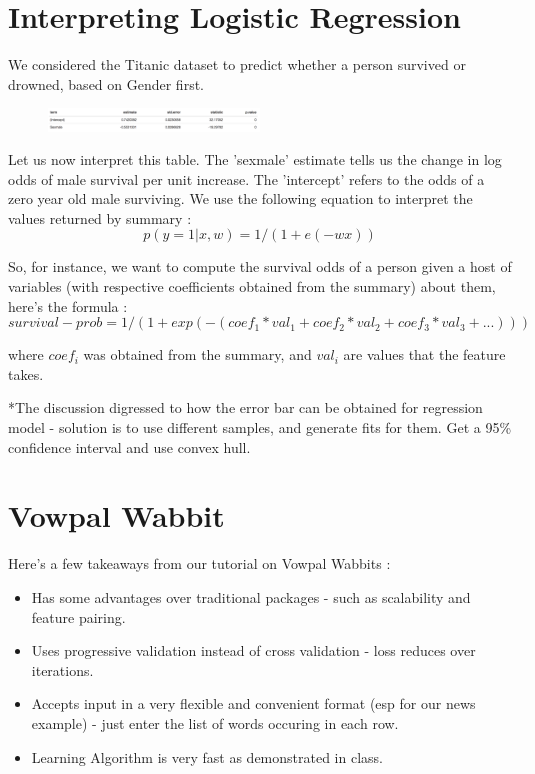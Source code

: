 \section{Interpreting Logistic Regression}

We considered the Titanic dataset to predict whether a person survived or drowned, based on Gender first. 
\begin{figure}[ht]
  \begin{center}
    \includegraphics[width=0.5\textwidth]{figures/fig-3.png}
    \caption{}
    \label{fig:example_figure3}
  \end{center}
\end{figure}

Let us now interpret this table. The 'sexmale' estimate tells us the change in log odds of male survival per unit increase. The 'intercept' refers to the odds of a zero year old male surviving. We use the following equation to interpret the values returned by summary :
\begin{equation}
  p(y=1|x,w) = 1/(1+e(-wx))
\end{equation}

So, for instance, we want to compute the survival odds of a person given a host of variables (with respective coefficients obtained from the summary) about them, here's the formula :
\begin{equation}
  survival-prob = 1/(1+exp(-(coef_{1}*val_{1} +coef_{2}*val_{2} + coef_{3}*val_{3} + ...)))
\end{equation}

where $ coef_{i}$ was obtained from the summary, and $val_{i}$ are values that the feature takes.

*The discussion digressed to how the error bar can be obtained for regression model - solution is to use different samples, and generate fits for them. Get a 95\% confidence interval and use convex hull.



\section{Vowpal Wabbit}

Here's a few takeaways from our tutorial on Vowpal Wabbits :
\begin{itemize}
  \item Has some advantages over traditional packages - such as scalability and feature pairing.
  \item Uses progressive validation instead of cross validation - loss reduces over iterations.
  \item Accepts input in a very flexible and convenient format (esp for our news example) - just enter the list of words occuring in each row.
  \item Learning Algorithm is very fast as demonstrated in class.
\end{itemize}

